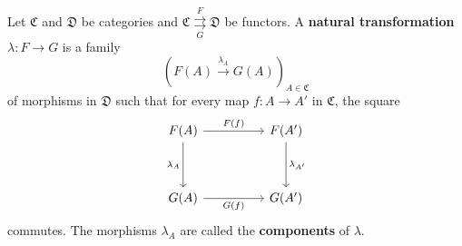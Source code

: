 \begin{definition}
	Let $\mathfrak{C}$ and $\mathfrak{D}$ be categories and $\mathfrak{C} \overset{F}{\underset{G}{\rightrightarrows}} \mathfrak{D}$ be functors. A \textbf{natural transformation} $\lambda : F \longrightarrow G$ is a family \[ \left( F(A) \overset{\lambda_A}{\longrightarrow} G(A) \right)_{A \in \mathfrak{C}} \] of morphisms in $\mathfrak{D}$ such that for every map $f : A \longrightarrow A'$ in $\mathfrak{C}$, the square 
	\[\begin{tikzcd}
		{F(A)} && {F(A')} \\
		\\
		{G(A)} && {G(A')}
		\arrow["{\lambda_A}"', from=1-1, to=3-1]
		\arrow["{G(f)}"', from=3-1, to=3-3]
		\arrow["{\lambda_{A'}}", from=1-3, to=3-3]
		\arrow["{F(f)}", from=1-1, to=1-3]
	\end{tikzcd}\]
	commutes. The morphisms $\lambda_A$ are called the \textbf{components} of $\lambda$.
\end{definition}